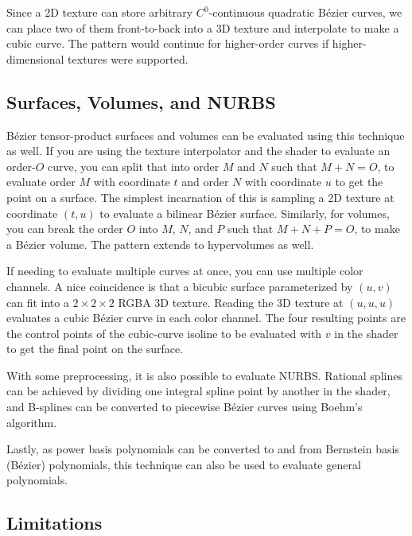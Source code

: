 \documentclass{jcgt}
\begin{document}


Since a 2D texture can store arbitrary $C^0$-continuous quadratic Bézier curves, we can place two of them front-to-back into a 3D texture and interpolate to make a cubic curve. The pattern would
continue for higher-order curves if higher-dimensional textures were supported.

\subsection{Surfaces, Volumes, and NURBS}

Bézier tensor-product surfaces and volumes can be evaluated using this technique as well. If you are using the texture interpolator and the shader to evaluate an order-$O$ curve, you can split
that into order $M$ and $N$ such that $M+N=O$, to evaluate order $M$ with coordinate $t$ and order $N$ with coordinate $u$ to get the point on a surface.  The simplest incarnation of this
is sampling a 2D texture at coordinate $(t, u)$ to evaluate a bilinear Bézier surface. Similarly, for volumes, you can break the order $O$ into $M$, $N$, and $P$ such that $M+N+P=O$, to make
a Bézier volume. The pattern extends to hypervolumes as well.

If needing to evaluate multiple curves at once, you can use multiple color channels. A nice coincidence is that a bicubic surface parameterized by $(u,v)$ can fit into a $2 \times 2 \times 2$ RGBA 3D texture.
Reading the 3D texture at $(u,u,u)$ evaluates a cubic Bézier curve in each color channel. The four resulting points are the control points of the cubic-curve isoline to be evaluated with $v$ in
the shader to get the final point on the surface.

With some preprocessing, it is also possible to evaluate NURBS. Rational splines can be achieved by dividing one integral spline point by another in the shader, and B-splines can be converted
to piecewise Bézier curves using Boehm's algorithm.

Lastly, as power basis polynomials can be converted to and from Bernstein basis (Bézier) polynomials, this technique can also be used to evaluate general polynomials.

\subsection{Limitations}


\end{document}
